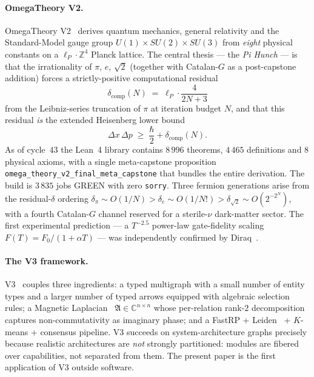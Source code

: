 \documentclass[11pt]{article}
\newcommand{\lP}{\ell_{P}}
\newcommand{\Zfour}{\mathbb{Z}^{4}}
\newcommand{\dcomp}{\delta_{\text{comp}}}
\newcommand{\magA}{\mathfrak{A}}
\begin{document}
\paragraph{OmegaTheory V2.}
OmegaTheory V2~\citep{marchewka2026omegatheory} derives quantum mechanics,
general relativity and the Standard-Model gauge group
$U(1) \times SU(2) \times SU(3)$ from \emph{eight} physical constants on
a $\lP \cdot \Zfour$ Planck lattice. The central thesis --- the
\emph{Pi Hunch} --- is that the irrationality of $\pi$, $e$, $\sqrt{2}$
(together with Catalan-$G$ as a post-capstone addition) forces a
strictly-positive computational residual
\begin{equation}
  \dcomp(N) \;=\; \lP \cdot \frac{4}{2N+3}
  \label{eq:deltacomp}
\end{equation}
from the Leibniz-series truncation of $\pi$ at iteration budget $N$, and
that this residual \emph{is} the extended Heisenberg lower bound
\begin{equation}
  \Delta x\,\Delta p \;\geq\; \frac{\hbar}{2} + \dcomp(N).
  \label{eq:heisenberg}
\end{equation}
As of cycle~$43$ the Lean~4 library contains $8\,996$ theorems, $4\,465$
definitions and $8$ physical axioms, with a single meta-capstone
proposition \lstinline|omega_theory_v2_final_meta_capstone| that bundles
the entire derivation. The build is $3\,835$ jobs GREEN with zero
\lstinline|sorry|. Three fermion generations arise from the
residual-$\delta$ ordering
$\delta_\pi \sim O(1/N) > \delta_e \sim O(1/N!) > \delta_{\sqrt{2}} \sim O(2^{-2^N})$,
with a fourth Catalan-$G$ channel reserved for a sterile-$\nu$
dark-matter sector. The first experimental prediction --- a $T^{-2.5}$
power-law gate-fidelity scaling $F(T) = F_0/(1+\alpha T)$ --- was
independently confirmed by Diraq~\citep{huang2024diraq}.

\paragraph{The V3 framework.}
V3~\citep{marchewka2026v3} couples three ingredients: a typed multigraph
with a small number of entity types and a larger number of typed arrows
equipped with algebraic selection rules; a Magnetic
Laplacian~\citep{liebloss1993magnetic,zhang2021magnet}
$\magA\in\mathbb{C}^{n\times n}$ whose per-relation rank-$2$ decomposition
captures non-commutativity as imaginary phase; and a FastRP
\citep{chen2019fastrp} + Leiden~\citep{traag2019leiden} +
$K$-means + consensus pipeline.
V3 succeeds on system-architecture graphs precisely because realistic
architectures are \emph{not} strongly partitioned: modules are fibered
over capabilities, not separated from them. The present paper is the
first application of V3 outside software.
\end{document}
